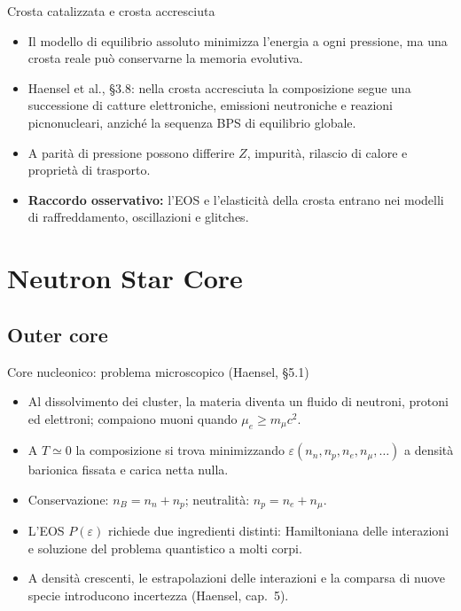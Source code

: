 \begin{frame}[t]{Crosta catalizzata e crosta accresciuta}
\small
\begin{itemize}
\item Il modello di equilibrio assoluto minimizza l'energia a ogni pressione, ma una crosta reale può conservarne la memoria evolutiva.
\item Haensel et al., \S3.8: nella crosta accresciuta la composizione segue una successione di catture elettroniche, emissioni neutroniche e reazioni picnonucleari, anziché la sequenza BPS di equilibrio globale.
\item A parità di pressione possono differire \(Z\), impurità, rilascio di calore e proprietà di trasporto.
\item \textbf{Raccordo osservativo:} l'EOS e l'elasticità della crosta entrano nei modelli di raffreddamento, oscillazioni e glitches.
\end{itemize}
\end{frame}

\section{Neutron Star Core}

\subsection{Outer core}

\begin{frame}[t]{Core nucleonico: problema microscopico (Haensel, §5.1)}
\small
\begin{itemize}
\item Al dissolvimento dei cluster, la materia diventa un fluido di neutroni, protoni ed elettroni; compaiono muoni quando $\mu_e\ge m_\mu c^2$.
\item A $T\simeq0$ la composizione si trova minimizzando $\varepsilon(n_n,n_p,n_e,n_\mu,\ldots)$ a densità barionica fissata e carica netta nulla.
\item Conservazione: $n_B=n_n+n_p$; neutralità: $n_p=n_e+n_\mu$.
\item L'EOS $P(\varepsilon)$ richiede due ingredienti distinti: Hamiltoniana delle interazioni e soluzione del problema quantistico a molti corpi.
\item A densità crescenti, le estrapolazioni delle interazioni e la comparsa di nuove specie introducono incertezza (Haensel, cap.~5).
\end{itemize}
\end{frame}

